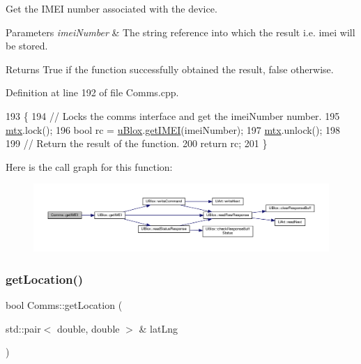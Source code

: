 Get the I\+M\+EI number associated with the device.


\begin{DoxyParams}{Parameters}
{\em imei\+Number} & The string reference into which the result i.\+e. imei will be stored. \\
\hline
\end{DoxyParams}
\begin{DoxyReturn}{Returns}
True if the function successfully obtained the result, false otherwise. 
\end{DoxyReturn}


Definition at line 192 of file Comms.\+cpp.


\begin{DoxyCode}
193 \{
194     \textcolor{comment}{// Locks the comms interface and get the imeiNumber number.}
195     \hyperlink{class_comms_a21df861b1202573e4cd0cb5666d638fe}{mtx}.lock();
196     \textcolor{keywordtype}{bool} rc = \hyperlink{class_comms_ac64dea134b116147e5441172346dbd6c}{uBlox}.\hyperlink{class_u_blox_ade30654ab2eab43d322dc6b516866401}{getIMEI}(imeiNumber);
197     \hyperlink{class_comms_a21df861b1202573e4cd0cb5666d638fe}{mtx}.unlock();
198 
199     \textcolor{comment}{// Return the result of the function.}
200     \textcolor{keywordflow}{return} rc;
201 \}
\end{DoxyCode}
Here is the call graph for this function\+:\nopagebreak
\begin{figure}[H]
\begin{center}
\leavevmode
\includegraphics[width=350pt]{d8/dcc/class_comms_ab545396d2360e34fd94e7c3a996e967d_cgraph}
\end{center}
\end{figure}
\mbox{\label{class_comms_a26030245503e82aa6278e39cd0886c31}} 
\subsubsection{\texorpdfstring{get\+Location()}{getLocation()}\hspace{0.1cm}{\footnotesize\ttfamily [1/2]}}
{\footnotesize\ttfamily bool Comms\+::get\+Location (\begin{DoxyParamCaption}\item[{std\+::pair$<$ double, double $>$ \&}]{lat\+Lng }\end{DoxyParamCaption})}

